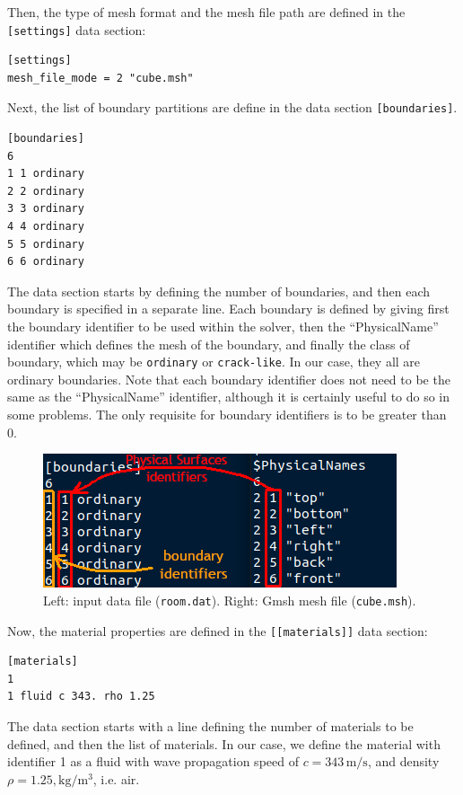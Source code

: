\documentclass[a4]{article}
\begin{document}
Then, the type of mesh format and the mesh file path are defined in the \texttt{[settings]} data section:
\begin{Verbatim}[frame=single, fontsize=\small, label=room.dat]
[settings]
mesh_file_mode = 2 "cube.msh"
\end{Verbatim}

Next, the list of boundary partitions are define in the data section \texttt{[boundaries]}.
\begin{Verbatim}[frame=single, fontsize=\small, label=room.dat]
[boundaries]
6
1 1 ordinary
2 2 ordinary
3 3 ordinary
4 4 ordinary
5 5 ordinary
6 6 ordinary
\end{Verbatim}
The data section starts by defining the number of boundaries, and then each boundary is specified in a separate line. Each boundary is defined by giving first the boundary identifier to be used within the solver, then the ``PhysicalName'' identifier which defines the mesh of the boundary, and finally the class of boundary, which may be \texttt{ordinary} or \texttt{crack-like}. In our case, they all are ordinary boundaries. Note that each boundary identifier does not need to be the same as the ``PhysicalName'' identifier, although it is certainly useful to do so in some problems. The only requisite for boundary identifiers is to be greater than 0.

\begin{figure}[h]
\centering
\includegraphics[scale=0.5]{boundaries_physical.png}
\caption{Left: input data file (\texttt{room.dat}). Right: Gmsh mesh file (\texttt{cube.msh}).}
\end{figure}

Now, the material properties are defined in the \texttt{[[materials]]} data section:
\begin{Verbatim}[frame=single, fontsize=\small, label=room.dat]
[materials]
1
1 fluid c 343. rho 1.25
\end{Verbatim}
The data section starts with a line defining the number of materials to be defined, and then the list of materials. In our case, we define the material with identifier 1 as a fluid with wave propagation speed of $c=343\,\mathrm{m/s}$, and density $\rho=1.25,\mathrm{kg/m^3}$, i.e. air.
\end{document}
